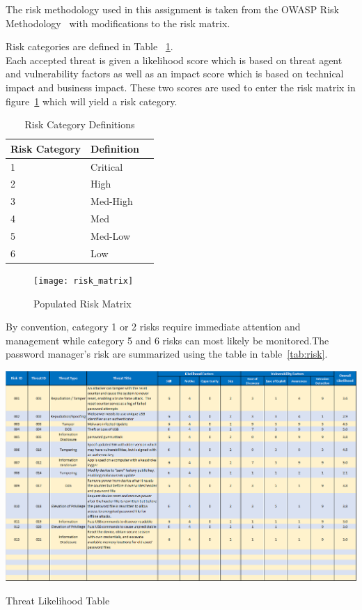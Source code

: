 
The risk methodology used in this assignment is taken from the OWASP Risk
Methodology~\cite{owasprisk} with modifications to the risk matrix.





Risk categories are defined in Table ~\ref{tab:risk_cat}.\\


Each accepted threat is given a likelihood score which is based on threat agent and vulnerability factors as well as an impact score which is based on technical impact and business impact.  These two scores are used to enter the risk matrix in figure~\ref{fig:riskmatrix} which will yield a risk category.

\begin{table}[h]
    \centering
    \begin{tabular}{l l l }
    \hline
    Risk Category & Definition \\
    \hline
    1 & Critical\\
    2 & High\\
    3 & Med-High\\
    4 & Med\\
    5 & Med-Low\\
    6 & Low \\
    \end{tabular}
    \caption{Risk Category Definitions}
    \label{tab:risk_cat}
\end{table}

\begin{figure}[]
    \centering
    \texttt{[image: risk\_matrix]}
    \caption{Populated Risk Matrix}
    \label{fig:riskmatrix}
\end{figure}

By convention, category 1 or 2 risks require immediate attention and management
while category 5 and 6 risks can most likely be monitored.The password manager's risk are summarized using the table in table~\ref{tab:risk}.


\begin{table}
    \includegraphics[]{owasp_likelihood}
    \caption{Threat Likelihood Table}
    \label{tab:likelihood}
\end{table}


